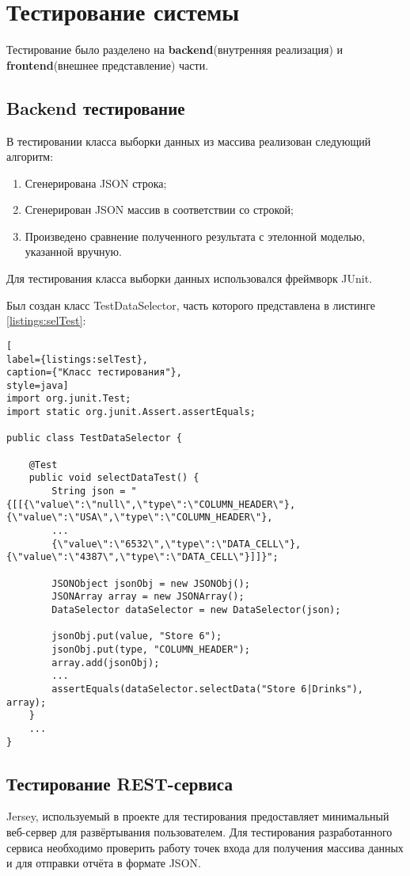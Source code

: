 \chapter{Тестирование системы}
Тестирование было разделено на \textbf{backend}(внутренняя реализация) и \textbf{frontend}(внешнее представление) части.

\section{Backend тестирование}

В тестировании класса выборки данных из массива реализован следующий алгоритм:

\begin{enumerate}
	\item Сгенерирована JSON строка;
	\item Сгенерирован JSON массив в соответствии со строкой;
	\item Произведено сравнение полученного результата с этелонной моделью, указанной вручную.
\end{enumerate} 

Для тестирования класса выборки данных использовался фреймворк JUnit.

Был создан класс TestDataSelector, часть которого представлена в листинге \ref{listings:selTest}:

\begin{lstlisting}[
label={listings:selTest},
caption={"Класс тестирования"},
style=java]
import org.junit.Test;
import static org.junit.Assert.assertEquals;

public class TestDataSelector {

	@Test
	public void selectDataTest() {
		String json = "{[[{\"value\":\"null\",\"type\":\"COLUMN_HEADER\"}, {\"value\":\"USA\",\"type\":\"COLUMN_HEADER\"},
		...
		{\"value\":\"6532\",\"type\":\"DATA_CELL\"}, {\"value\":\"4387\",\"type\":\"DATA_CELL\"}]]}";
		
		JSONObject jsonObj = new JSONObj();
		JSONArray array = new JSONArray();
		DataSelector dataSelector = new DataSelector(json);
		
		jsonObj.put(value, "Store 6");
		jsonObj.put(type, "COLUMN_HEADER");
		array.add(jsonObj);
		...
		assertEquals(dataSelector.selectData("Store 6|Drinks"), array);
	}
	...
}
\end{lstlisting}

\section{Тестирование REST-сервиса}
Jersey, используемый в проекте для тестирования предоставляет минимальный веб-сервер для развёртывания пользователем. Для тестирования разработанного сервиса необходимо проверить работу точек входа для получения массива данных и для отправки отчёта в формате JSON. 

